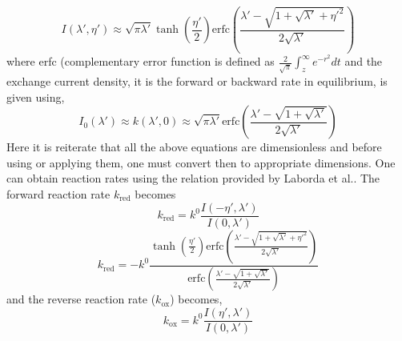 \documentclass[12pt]{book}
\begin{document}
\begin{equation}
I\left(\lambda',\eta'\right)\approx\sqrt{\pi\lambda'}\tanh\left(\frac{\eta'}{2}\right)\textrm{erfc}\left(\frac{\lambda'-\sqrt{1+\sqrt{\lambda'}+\eta'^{2}}}{2\sqrt{\lambda'}}\right)
\end{equation}
where erfc (complementary error function is defined as $\frac{2}{\sqrt{\pi}}\int_z^\infty e^{-r^2}dt$ and the exchange current density, it is the forward or backward rate in equilibrium, is given using,
\begin{equation}
I_{0}\left(\lambda'\right)\approx k\left(\lambda',0\right)\approx\sqrt{\pi\lambda'}\textrm{erfc}\left(\frac{\lambda'-\sqrt{1+\sqrt{\lambda'}}}{2\sqrt{\lambda'}}\right)\label{eq:equilibrium_rate}
\end{equation}
Here it is reiterate that all the above equations are dimensionless and before using or applying them, one must convert then to appropriate dimensions. One can obtain reaction rates using the relation provided by Laborda et al.\cite{Laborda2012}.
The forward reaction rate $k_\textrm{red}$ becomes
\begin{equation}
k_{\textrm{red}}=k^{0}\frac{I\left(-\eta',\lambda'\right)}{I\left(0,\lambda'\right)}
\end{equation}
\begin{equation}
k_{\textrm{red}}=-k^{0}\frac{\tanh\left(\frac{\eta'}{2}\right)\textrm{erfc}\left(\frac{\lambda'-\sqrt{1+\sqrt{\lambda'}+\eta'^{2}}}{2\sqrt{\lambda'}}\right)}{\textrm{erfc}\left(\frac{\lambda'-\sqrt{1+\sqrt{\lambda'}}}{2\sqrt{\lambda'}}\right)}
\end{equation}
and the reverse reaction rate ($k_{\textrm{ox}}$) becomes,
\begin{equation}
k_{\textrm{ox}}=k^{0}\frac{I\left(\eta',\lambda'\right)}{I\left(0,\lambda'\right)}
\end{equation}
\end{document}
